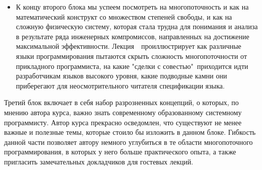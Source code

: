 \documentclass[a4paper, 12pt]{extarticle}
\begin{document}
\begin{itemize}
\item К концу второго блока мы успеем посмотреть на многопоточность и как на математический конструкт со множеством степеней свободы, и как на сложную физическую систему, которая стала трудна для понимания и анализа в результате ряда инженерных компромиссов, направленных на достижение максимальной эффективности. Лекция~\langMMNum~проиллюстрирует как различные языки программирования пытаются скрыть сложность многопоточности от прикладного программиста, на какие "сделки с совестью"\ приходится идти разработчикам языков высокого уровня, какие подводные камни они приберегают для неосмотрительного читателя спецификации языка.

\end{itemize}

Третий блок включает в себя набор разрозненных концепций, о которых, по мнению автора курса, важно знать современному образованному системному программисту. Автор курса прекрасно осведомлен, что существуют не менее важные и полезные темы, которые стоило бы изложить в данном блоке. Гибкость данной части позволяет автору немного углубиться в те области многопоточного программирования, в которых у него больше практического опыта, а также пригласить замечательных докладчиков для гостевых лекций.
\end{document}
